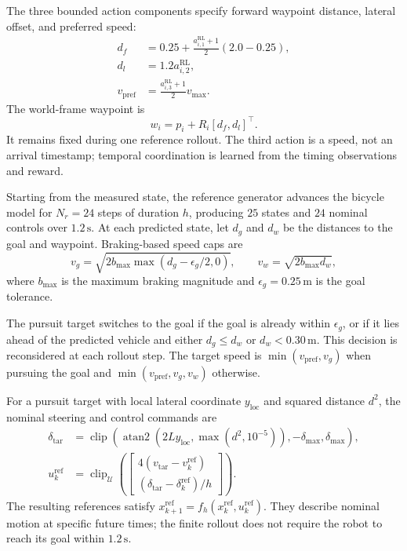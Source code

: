 The three bounded action components specify forward waypoint distance,
lateral offset, and preferred speed:
\begin{align}
    d_f &= 0.25+\frac{a_{i,1}^{\mathrm{RL}}+1}{2}(2.0-0.25),\\
    d_l &= 1.2a_{i,2}^{\mathrm{RL}},\\
    v_{\mathrm{pref}} &= \frac{a_{i,3}^{\mathrm{RL}}+1}{2}v_{\max}.
\end{align}
The world-frame waypoint is
\begin{equation}
    w_i=p_i+R_i[d_f,d_l]^\top.
\end{equation}
It remains fixed during one reference rollout. The third action is a speed,
not an arrival timestamp; temporal coordination is learned from the timing
observations and reward.

Starting from the measured state, the reference generator advances the
bicycle model for $N_r=24$ steps of duration $h$, producing $25$ states and
$24$ nominal controls over $1.2\,\mathrm{s}$. At each predicted state,
let $d_g$ and $d_w$ be the distances to the goal and waypoint. Braking-based
speed caps are
\begin{equation}
    v_g=\sqrt{2b_{\max}\max(d_g-\epsilon_g/2,0)},
    \qquad v_w=\sqrt{2b_{\max}d_w},
\end{equation}
where $b_{\max}$ is the maximum braking magnitude and
$\epsilon_g=0.25\,\mathrm{m}$ is the goal tolerance.

The pursuit target switches to the goal if the goal is already within
$\epsilon_g$, or if it lies ahead of the predicted vehicle and either
$d_g\leq d_w$ or $d_w<0.30\,\mathrm{m}$. This decision is reconsidered at
each rollout step. The target speed is $\min(v_{\mathrm{pref}},v_g)$ when
pursuing the goal and $\min(v_{\mathrm{pref}},v_g,v_w)$ otherwise.

For a pursuit target with local lateral coordinate $y_{\mathrm{loc}}$ and
squared distance $d^2$, the nominal steering and control commands are
\begin{align}
    \delta_{\mathrm{tar}}
    &=\operatorname{clip}\!\left(
        \operatorname{atan2}(2Ly_{\mathrm{loc}},\max(d^2,10^{-5})),
        -\delta_{\max},\delta_{\max}\right),\\
    u_k^{\mathrm{ref}}
    &=\operatorname{clip}_{\mathcal U}\!\left(
        \begin{bmatrix}
            4(v_{\mathrm{tar}}-v_k^{\mathrm{ref}})\\
            (\delta_{\mathrm{tar}}-\delta_k^{\mathrm{ref}})/h
        \end{bmatrix}\right).
\end{align}
The resulting references satisfy
$x_{k+1}^{\mathrm{ref}}=f_h(x_k^{\mathrm{ref}},u_k^{\mathrm{ref}})$.
They describe nominal motion at specific future times; the finite rollout
does not require the robot to reach its goal within $1.2\,\mathrm{s}$.

